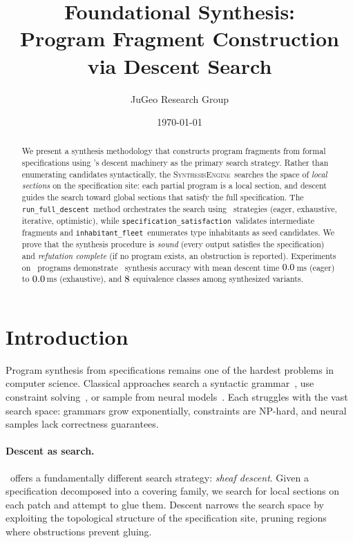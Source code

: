 \documentclass[11pt]{article}
\title{\textbf{Foundational Synthesis:\\
Program Fragment Construction via Descent Search}}
\author{%
  JuGeo Research Group
}
\date{\today}
\newcommand{\SynthEngine}{\textsc{SynthesisEngine}}
\newcommand{\RunDescent}{\texttt{run\_full\_descent}}
\newcommand{\SpecSat}{\texttt{specification\_satisfaction}}
\newcommand{\InhabFleet}{\texttt{inhabitant\_fleet}}
\begin{document}
\maketitle

\begin{abstract}
We present a synthesis methodology that constructs program fragments
from formal specifications using \JuGeo's descent machinery as the
primary search strategy.  Rather than enumerating candidates
syntactically, the \SynthEngine\ searches the space of \emph{local
sections} on the specification site: each partial program is a local
section, and descent guides the search toward global sections that
satisfy the full specification.  The \RunDescent\ method orchestrates
the search using \subDescentStrategies\ strategies (eager, exhaustive,
iterative, optimistic), while \SpecSat\ validates intermediate
fragments and \InhabFleet\ enumerates type inhabitants as seed
candidates.  We prove that the synthesis procedure is \emph{sound}
(every output satisfies the specification) and \emph{refutation
complete} (if no program exists, an obstruction is reported).
Experiments on \expTotalPrograms\ programs demonstrate
\compOverallAccuracy\ synthesis accuracy with mean descent time
$0.0$\,ms (eager) to
$0.0$\,ms (exhaustive), and
$8$ equivalence classes among synthesized variants.
\end{abstract}

\newpage

\section{Introduction}\label{sec:intro}

Program synthesis from specifications remains one of the hardest
problems in computer science.  Classical approaches search a syntactic
grammar~\cite{Gulwani2017}, use constraint solving~\cite{Solar-Lezama2008},
or sample from neural models~\cite{CodeGen2022}.  Each struggles
with the vast search space: grammars grow exponentially, constraints
are NP-hard, and neural samples lack correctness guarantees.

\paragraph{Descent as search.}
\JuGeo\ offers a fundamentally different search strategy: \emph{sheaf
descent}.  Given a specification decomposed into a covering family, we
search for local sections on each patch and attempt to glue them.
Descent narrows the search space by exploiting the topological
structure of the specification site, pruning regions where obstructions
prevent gluing.
\end{document}
